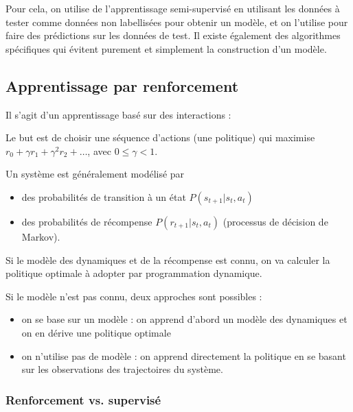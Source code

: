 		Pour cela, on utilise de l'apprentissage semi-supervisé en utilisant les données à tester comme données non labellisées  pour obtenir un modèle, et on l'utilise pour faire des prédictions sur les données de test. Il existe également des algorithmes spécifiques qui évitent purement et simplement la construction d'un modèle.
		
		\subsection{Apprentissage par renforcement}
		
		Il s'agit d'un apprentissage basé sur des interactions :
		
		
		Le but est de choisir une séquence d'actions (une politique) qui maximise $r_0 + \gamma r_1 + \gamma^2 r_2 + \dots$, avec $0 \leq \gamma < 1$.
		
		
		Un système est généralement modélisé par
		
		\begin{itemize}
			\item des probabilités de transition à un état $P(s_{t + 1} \vert s_t, a_t)$
			\item des probabilités de récompense $P(r_{t + 1} \vert s_t, a_t)$ 		(processus de décision de Markov).
		\end{itemize}
		
		Si le modèle des dynamiques et de la récompense est connu, on va calculer la politique optimale à adopter par programmation dynamique.
		
		Si le modèle n'est pas connu, deux approches sont possibles :
		
		\begin{itemize}
			\item on se base sur un modèle : on apprend d'abord un modèle des dynamiques et on en dérive une politique optimale
			\item on n'utilise pas de modèle : on apprend directement la politique en se basant sur les observations des trajectoires du système.
		\end{itemize}
		
			\subsubsection{Renforcement vs. supervisé}
			
